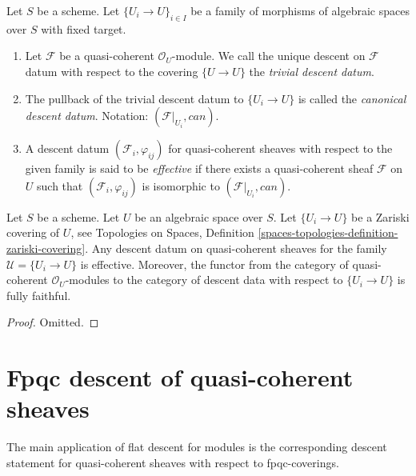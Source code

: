 \begin{definition}
\label{definition-descent-datum-effective-quasi-coherent}
Let $S$ be a scheme.
Let $\{U_i \to U\}_{i \in I}$ be a family of morphisms of algebraic
spaces over $S$ with fixed target.
\begin{enumerate}
\item Let $\mathcal{F}$ be a quasi-coherent $\mathcal{O}_U$-module.
We call the unique descent on $\mathcal{F}$ datum with respect to the covering
$\{U \to U\}$ the {\it trivial descent datum}.
\item The pullback of the trivial descent datum to
$\{U_i \to U\}$ is called the {\it canonical descent datum}.
Notation: $(\mathcal{F}|_{U_i}, can)$.
\item A descent datum $(\mathcal{F}_i, \varphi_{ij})$
for quasi-coherent sheaves with respect to the given family
is said to be {\it effective} if there exists a quasi-coherent
sheaf $\mathcal{F}$ on $U$ such that $(\mathcal{F}_i, \varphi_{ij})$
is isomorphic to $(\mathcal{F}|_{U_i}, can)$.
\end{enumerate}
\end{definition}

\begin{lemma}
\label{lemma-zariski-descent-effective}
Let $S$ be a scheme. Let $U$ be an algebraic space over $S$.
Let $\{U_i \to U\}$ be a Zariski covering of $U$, see
Topologies on Spaces,
Definition \ref{spaces-topologies-definition-zariski-covering}.
Any descent datum on quasi-coherent sheaves
for the family $\mathcal{U} = \{U_i \to U\}$ is
effective. Moreover, the functor from the category of
quasi-coherent $\mathcal{O}_U$-modules to the category
of descent data with respect to $\{U_i \to U\}$ is fully faithful.
\end{lemma}

\begin{proof}
Omitted.
\end{proof}












\section{Fpqc descent of quasi-coherent sheaves}
\label{section-fpqc-descent-quasi-coherent}

\noindent
The main application of flat descent for modules is
the corresponding descent statement for quasi-coherent
sheaves with respect to fpqc-coverings.

